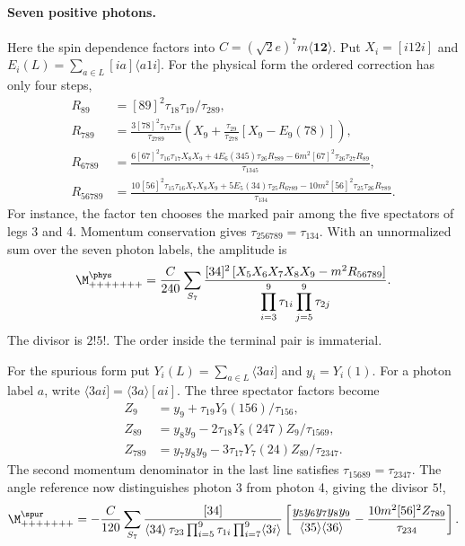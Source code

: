 \paragraph{Seven positive photons.}
Here the spin dependence factors into
$C=(\sqrt{2}e)^7m\langle\mathbf1\mathbf2\rangle$. Put
$X_i=[i12i]$ and $E_i(L)=\sum_{a\in L}[ia]\langle a1i]$.
For the physical form the ordered correction has only four steps,
\begin{align*}
 R_{89}&=[89]^2\tau_{18}\tau_{19}/\tau_{289},\\
 R_{789}&=\frac{3[78]^2\tau_{17}\tau_{18}}{\tau_{2789}}
 \left(X_9+\frac{\tau_{29}}{\tau_{278}}[X_9-E_9(78)]\right),\\
 R_{6789}&=\frac{6[67]^2\tau_{16}\tau_{17}X_8X_9
  +4 E_6(345)\tau_{26}R_{789}
  -6m^2[67]^2\tau_{26}\tau_{27}R_{89}}{\tau_{1345}},\\
 R_{56789}&=\frac{10[56]^2\tau_{15}\tau_{16} X_7X_8X_9
 +5 E_5(34)\tau_{25}R_{6789}
 -10m^2[56]^2\tau_{25}\tau_{26}R_{789}}{\tau_{134}} .
\end{align*}
For instance, the factor ten chooses the marked pair among the five
spectators of legs 3 and 4. Momentum conservation gives
$\tau_{256789}=\tau_{134}$. With an unnormalized sum over the seven
photon labels, the amplitude is
\begin{equation}
 \M^{\phys}_{+++++++}=\frac{C}{240}\sum_{S_7}
 \frac{[34]^2\,[X_5X_6X_7X_8X_9-m^2R_{56789}]}
 {\displaystyle\prod_{i=3}^9\tau_{1i}\prod_{j=5}^9\tau_{2j}}.
 \label{eq:nine-seven-physical}
\end{equation}
The divisor is $2!5!$. The order inside the terminal pair is immaterial.

For the spurious form put
$Y_i(L)=\sum_{a\in L}\langle3ai]$ and
$y_i=Y_i(1)$. For a photon label $a$, write $\langle3ai]=\langle3a\rangle[ai]$.
The three spectator factors become
\begin{align*}
 Z_9 &= y_9+\tau_{19}Y_9(156)/\tau_{156},\\
 Z_{89} &= y_8y_9-2\tau_{18}Y_8(247)Z_9/\tau_{1569},\\
 Z_{789} &=y_7y_8y_9-3\tau_{17}Y_7(24)Z_{89}/\tau_{2347}.
\end{align*}
The second momentum denominator in the last line satisfies
$\tau_{15689}=\tau_{2347}$. The angle reference now distinguishes
photon 3 from photon 4, giving the divisor $5!$,
\begin{equation}
 \M^{\spur}_{+++++++}=-\frac{C}{120}\sum_{S_7}
 \frac{[34]}{\langle34\rangle\,\tau_{23}\prod_{i=5}^9\tau_{1i}\prod_{i=7}^9\langle3i\rangle}
 \left[\frac{y_5y_6y_7y_8y_9}{\langle35\rangle\langle36\rangle}-
 \frac{10m^2[56]^2Z_{789}}{\tau_{234}}\right].
 \label{eq:nine-seven-spurious}
\end{equation}

